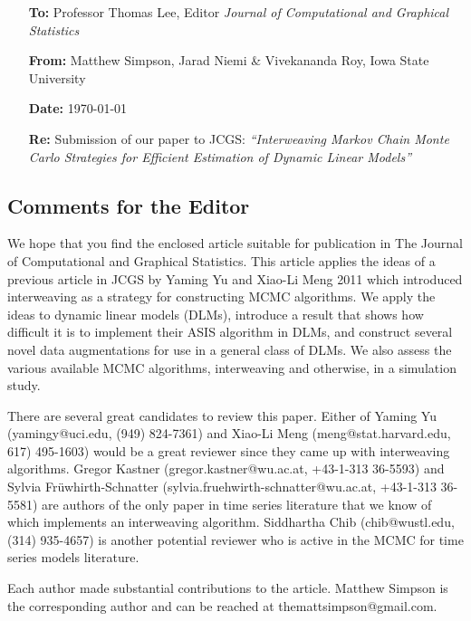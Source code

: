 \documentclass[11pt]{article}
\begin{document}
\begin{itemize}
\item[\bf To:]  Professor Thomas Lee,  Editor\newline
{\em Journal of Computational and Graphical Statistics}
\item[\bf From:] Matthew Simpson, Jarad Niemi \& Vivekananda Roy, Iowa State University
\item[\bf Date:] \today
\item[\bf Re:] Submission of our paper to JCGS:
{\em ``Interweaving Markov Chain Monte Carlo Strategies for Efficient
    Estimation of Dynamic Linear Models''}
\end{itemize}

\subsection*{Comments for the Editor}

We hope that you find the enclosed article suitable for publication in The Journal of Computational and Graphical Statistics. This article applies the ideas of a previous article in JCGS by Yaming Yu and Xiao-Li Meng 2011 which introduced interweaving as a strategy for constructing MCMC algorithms. We apply the ideas to dynamic linear models (DLMs), introduce a result that shows how difficult it is to implement their ASIS algorithm in DLMs, and construct several novel data augmentations for use in a general class of DLMs. We also assess the various available MCMC algorithms, interweaving and otherwise, in a simulation study.

There are several great candidates to review this paper. Either of Yaming Yu (yamingy@uci.edu, (949) 824-7361) and Xiao-Li Meng (meng@stat.harvard.edu, 617) 495-1603) would be a great reviewer since they came up with interweaving algorithms. Gregor Kastner (gregor.kastner@wu.ac.at, +43-1-313 36-5593) and Sylvia Fr{\"u}whirth-Schnatter (sylvia.fruehwirth-schnatter@wu.ac.at, +43-1-313 36-5581) are authors of the only paper in time series literature that we know of which implements an interweaving algorithm. Siddhartha Chib (chib@wustl.edu, (314) 935-4657) is another potential reviewer who is active in the MCMC for time series models literature.

Each author made substantial contributions to the article. Matthew Simpson is the corresponding author and can be reached at themattsimpson@gmail.com.
\end{document}
